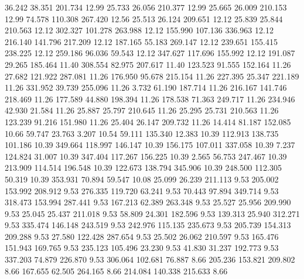   36.242   38.351  201.734        12.99
  25.733   26.056  210.377        12.99
  25.665   26.009  210.153        12.99
  74.578  110.308  267.420        12.56
  25.513   26.124  209.651        12.12
  25.839   25.844  210.563        12.12
 302.327  101.278  263.988        12.12
 155.990  107.136  336.963        12.12
 216.140  141.796  217.209        12.12
 187.165   55.183  269.147        12.12
 239.651  155.415  238.225        12.12
 259.186   96.036   59.543        12.12
 347.627  117.696  155.992        12.12
 191.087   29.265  185.464        11.40
 308.554   82.975  207.617        11.40
 123.523   91.555  152.164        11.26
  27.682  121.922  287.081        11.26
 176.950   95.678  215.154        11.26
 227.395   25.347  221.189        11.26
 331.952   39.739  255.096        11.26
   3.732   61.190  187.714        11.26
 216.167  141.746  218.469        11.26
 177.589   44.880  198.394        11.26
 178.538   71.363  249.717        11.26
 234.946   42.930   21.584        11.26
  25.887   25.797  210.645        11.26
  25.295   25.731  210.563        11.26
 123.239   91.216  151.980        11.26
  25.404   26.147  209.732        11.26
  14.414   81.187  152.085        10.66
  59.747   23.763    3.207        10.54
  59.111  135.340   12.383        10.39
 112.913  138.735  101.186        10.39
 349.664  118.997  146.147        10.39
 156.175  107.011  337.058        10.39
   7.237  124.824   31.007        10.39
 347.404  117.267  156.225        10.39
   2.565   56.753  247.467        10.39
 213.909  114.514  196.548        10.39
 122.673  138.794  345.906        10.39
 248.500  112.305   50.319        10.39
 353.931   70.894   59.547        10.08
  25.099   26.239  211.113         9.53
 205.002  153.992  208.912         9.53
 276.335  119.720   63.241         9.53
  70.443   97.894  349.714         9.53
 318.473  153.994  287.441         9.53
 167.213   62.389  263.348         9.53
  25.527   25.956  209.990         9.53
  25.045   25.437  211.018         9.53
  58.809   24.301  182.596         9.53
 139.313   25.940  312.271         9.53
 335.474  146.148  243.519         9.53
 242.976  115.135  235.673         9.53
 205.739  154.313  209.288         9.53
  27.580  122.428  287.654         9.53
  25.502   26.062  210.597         9.53
 165.476  151.943  169.765         9.53
 235.123  105.496   23.230         9.53
  41.830   31.237  192.773         9.53
 337.203   74.879  226.870         9.53
 306.064  102.681   76.887         8.66
 205.236  153.821  209.802         8.66
 167.655   62.505  264.165         8.66
 214.084  140.338  215.633         8.66
